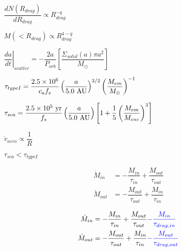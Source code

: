 \documentclass[12pt,a4paper]{article}
\newcommand{\Blue}[1]{\textcolor{blue}{#1}} %
\begin{document}
$ \dfrac{dN(R_{drag})}{dR_{drag}} \propto R_{drag}^{-q} $ \bigskip

$ M(< R_{drag}) \propto R_{drag}^{4 - q} $ \bigskip

$ \left . \dfrac{da}{dt} \right |_{scatter} = -\dfrac{2a}{P_{orb}}\left [ \dfrac{\Sigma_{solid}(a)\pi a^2}{M_{\odot}} \right ] $ \bigskip

$ \tau_{typeI} = \dfrac{2.5 \times 10^6}{c_a f_s}\left ( \dfrac{a}{5.0 \hbox{~AU}}\right )^{3/2}\left ( \dfrac{M_{em}}{M_{\oplus}} \right )^{-1} $ \bigskip

$ \tau_{sca} = \dfrac{2.5 \times 10^5 \hbox{~yr}}{f_s}\left ( \dfrac{a}{5.0 \hbox{~AU}}\right )\left [ 1 + \dfrac{1}{5}\left ( \dfrac{M_{em}}{M_{enc}} \right )^3\right ] $ \bigskip

$ \dot{v}_{aero} \propto \dfrac{1}{R} $ \bigskip

$ \tau_{sca} < \tau_{typeI} $

\begin{eqnarray}
\dot{M}_{in} &= - \dfrac{M_{in}}{\tau_{in}} + \dfrac{M_{out}}{\tau_{out}} \\
\dot{M}_{out} &= - \dfrac{M_{out}}{\tau_{out}} + \dfrac{M_{in}}{\tau_{in}}
\end{eqnarray}

\bigskip

\begin{eqnarray}
\dot{M}_{in} &= - \dfrac{M_{in}}{\tau_{in}} + \dfrac{M_{out}}{\tau_{out}} \Blue{- \dfrac{M_{in}}{\tau_{drag,in}}}  \\
\dot{M}_{out} &= - \dfrac{M_{out}}{\tau_{out}} + \dfrac{M_{in}}{\tau_{in}} \Blue{- \dfrac{M_{out}}{\tau_{drag,out}}}
\end{eqnarray}
\end{document}
